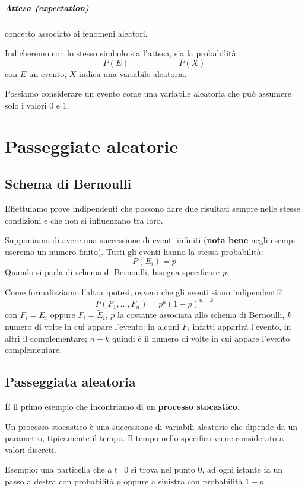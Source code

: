 \documentclass[a4paper,12pt]{book}
\begin{document}
\paragraph{Attesa (expectation)} concetto associato ai fenomeni aleatori.  

Indicheremo con lo stesso simbolo sia l'attesa, sia la probabilità: $$P(E) \qquad \qquad \qquad P(X)$$ con $E$ un evento, $ X $ indica una variabile aleatoria. 

Possiamo considerare un evento come una variabile aleatoria che può assumere solo i valori 0 e 1. 

\chapter{Passeggiate aleatorie}
\section{Schema di Bernoulli}
Effettuiamo prove indipendenti che possono dare due risultati sempre nelle stesse condizioni e che non si influenzano tra loro. 

Supponiamo di avere una successione di eventi infiniti (\textbf{nota bene} negli esempi useremo un numero finito).
Tutti gli eventi hanno la stessa probabilità:
$$P(E_i) = p$$
Quando si parla di schema di Bernoulli, bisogna specificare \textit{p}.

Come formalizziamo l'altra ipotesi, ovvero che gli eventi siano indipendenti?
$$P (F_1, ..., F_n ) = p^k(1-p)^{n-k}$$
con $ F_i = E_i $ oppure $ F_i = \widetilde{E}_i $, $ p $ la costante associata allo schema di Bernoulli, $ k $ numero di volte in cui appare l'evento: in alcuni $ F_i $ infatti apparirà l'evento, in altri il complementare; $ n-k $ quindi è il numero di volte in cui appare l'evento complementare.

\section{Passeggiata aleatoria}
È il primo esempio che incontriamo di un \textbf{processo stocastico}. 

Un processo stocastico è una successione di variabili aleatorie che dipende da un parametro, tipicamente il tempo. Il tempo nello specifico viene considerato a valori discreti. 

Esempio: una particella che a t=0 si trova nel punto 0, ad ogni istante fa un passo a destra con probabilità $ p $ oppure a sinistra con probabilità $ 1-p $. 
\end{document}
